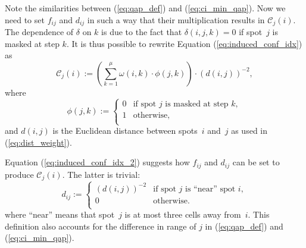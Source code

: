 \documentclass{bioinfo}
\begin{document}
Note the similarities between (\ref{eq:qap_def}) and (\ref{eq:ci_min_qap}). Now we need to set $f_{ij}$ and $d_{ij}$ in such a way that their multiplication results in $\mathcal{C}_{j}(i)$. The dependence of $\delta$ on $k$ is due to the fact that $\delta(i,j,k) = 0$ if spot~$j$ is masked at step $k$. It is thus possible to rewrite Equation (\ref{eq:induced_conf_idx}) as
\begin{equation}
\label{eq:induced_conf_idx_2}
\mathcal{C}_{j}(i) := \left( \sum_{k=1}^{\mu} \omega(i,k) \cdot \phi(j,k) \right) \cdot (d(i,j))^{-2},
\end{equation}
where
\begin{equation}
\phi(j,k) :=
        \left\{
                \begin{array}{ll}
                        0 & \mbox{if spot $j$ is masked at step $k$}, \\
                        1 & \mbox{otherwise}, \\
                \end{array}
        \right.
\end{equation}
and $d(i,j)$ is the Euclidean distance between spots~$i$ and~$j$ as used in (\ref{eq:dist_weight}).

Equation (\ref{eq:induced_conf_idx_2}) suggests how $f_{ij}$ and $d_{ij}$ can be set to produce $\mathcal{C}_j(i)$. The latter is trivial:
\begin{equation}
d_{ij} :=
        \left\{
                \begin{array}{ll}
                        (d(i,j))^{-2} & \mbox{if spot $j$ is ``near'' spot $i$}, \\
                        0 & \mbox{otherwise}. \\
                \end{array}
        \right.
\end{equation}
where ``near'' means that spot~$j$ is at most three cells away from~$i$. This definition also accounts for the difference in range of $j$ in (\ref{eq:qap_def}) and (\ref{eq:ci_min_qap}).
\end{document}
